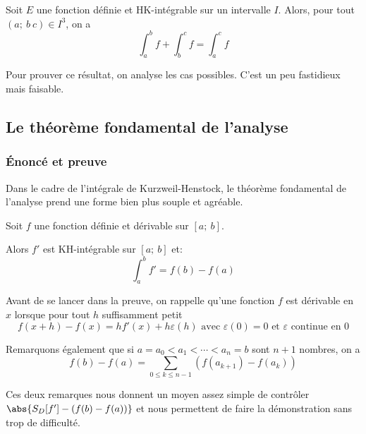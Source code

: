 \begin{theo}
Soit $E$ une fonction définie et HK-intégrable sur un intervalle $I$. Alors, pour tout $(a;~b~c) \in I^3$, on a
\[
\int_a^b f + \int_b^c f = \int_a^c f
\]
\end{theo}

Pour prouver ce résultat, on analyse les cas possibles. C'est un peu fastidieux mais faisable.

\subsection{Le théorème fondamental de l'analyse}

\subsubsection{Énoncé et preuve}

Dans le cadre de l'intégrale de Kurzweil-Henstock, le théorème fondamental de l'analyse prend une forme bien plus souple et agréable.


\begin{theo}
Soit $f$ une fonction définie et dérivable sur $[a;~b]$. 

Alors $f'$ est KH-intégrable sur $[a;~b]$ et:
\[
\int_a^b f' = f(b)-f(a)
\]
\end{theo}


Avant de se lancer dans la preuve, on rappelle qu'une fonction $f$ est dérivable en $x$ lorsque pour tout $h$ suffisamment petit
\[
f(x+h)-f(x) = hf'(x)+h\varepsilon(h) \text{ avec }\varepsilon(0) = 0 \text{ et }\varepsilon\text{ continue en }0
\]

Remarquons également que si $a=a_0 < a_1 < \cdots < a_n=b$ sont $n+1$ nombres, on a 
\[
f(b)-f(a) = \displaystyle{\sum \limits_{0 \leq k \leq n-1}} \left (f(a_{k+1})-f(a_k)\right )
\]

Ces deux remarques nous donnent un moyen assez simple de contrôler $\abs{S_D[f']-(f(b)-f(a))}$ et nous permettent de faire la démonstration sans trop de difficulté.

